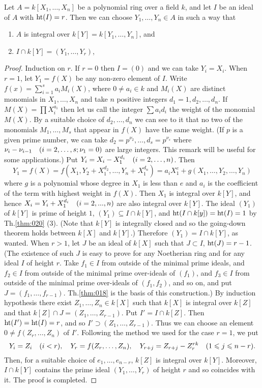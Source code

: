 \documentclass[../main]{subfiles}
\begin{document}
\begin{partheorem}\label{thm:024}
Let $A = k[X_1,\ldots,X_n]$ be a polynomial ring over a field $k$, and let $I$ be an ideal of $A$ with $\operatorname{ht}(I)=r$. Then we can choose $Y_1,\ldots,Y_n\in A$ in such a way that
\begin{enumerate}[label=\arabic*)]
    \item $A$ is integral over $k[Y] = k[Y_1,\ldots,Y_n]$, and
    \item $I\cap k[Y] = (Y_1,\ldots,Y_r)$,
\end{enumerate}
\end{partheorem}
\begin{proof}
Induction on $r$. If $r= 0$ then $I = (0)$ and we can take $Y_i=X_i$. When $r = 1$, let $Y_1=f(X)$ be any non-zero element of $I$. Write $f(x) = \sum_{i=1}^sa_iM_i(X)$, where $0 \neq a_i\in k$ and $M_i(X)$ are distinct monomials in $X_1,\ldots,X_n$ and take $n$ positive integers $d_1=1,d_2,\ldots,d_n$. If $M(X) = \prod X_i^{a_i}$ then let us call the integer $\sum a_id_i$ the weight of the monomial $M(X)$. By a suitable choice of $d_2,\ldots,d_n$ we can see to it that no two of the monomials $M_1,\ldots,M_s$ that appear in $f(X)$ have the same weight. (If $p$ is a given prime number, we can take $d_2=p^{\nu_2},\ldots,d_s = p^{\nu_s}$ where $\nu_i-\nu_{i-1}\for{i = 2,\ldots,s;\nu_1 = 0}$ are large integers. This remark will be useful for some applications.) Put $Y_i =X_i-X_1^{d_i}\for{i=2,\ldots,n}$. Then \[Y_1 = f(X) = f(X_1,Y_2+X_1^{d_2},\ldots,Y_n+X_1^{d_n})=a_iX_1^e+g(X_1,\ldots,Y_2,\ldots,Y_n)\] where $g$ is a polynomial whose degree in $X_1$ is less than $e$ and $a_i$ is the coefficient of the term with highest weight in $f(X)$. Then $X_1$ is integral over $k[Y]$, and hence $X_i=Y_i+X_1^{d_i}\for{i = 2,...,n}$ are also integral over $k[Y]$. The ideal $(Y_1)$ of $k[Y]$ is prime of height $1$, $(Y_1)\subseteq I\cap k[Y]$, and $\operatorname{ht}(I\cap k[y]) = \operatorname{ht}(I) = 1$ by Th.\ref{thm:020} (3). (Note that $k[Y]$ is integrally closed and so the going-down theorem holds between $k[X]$ and $k[Y]$.) Therefore $(Y_1) = I\cap k[Y]$, as wanted. When $r > 1$, let $J$ be an ideal of $k[X]$ such that $J\subset I$, $\operatorname{ht}(J) =r-1$. (The existence of such $J$ is easy to prove for any Noetherian ring and for any ideal $I$ of height $r$. Take $f_1 \in I$ from outside of the minimal prime ideals, and $f_2\in I$ from outside of the minimal prime over-ideals of $(f_1)$, and $f_3\in I$ from outside of the minimal prime over-ideals of $(f_1,f_2)$, and so on, and put $J = (f_1,\ldots,f_{r-1})$. Th.\ref{thm:018} is the basis of this construction.) By induction hypothesis there exist $Z_1,\ldots,Z_n\in k[X]$ such that $k[X]$ is integral over $k[Z]$ and that $k[Z]\cap J=(Z_1,\ldots,Z_{r-1})$. Put $I' = I\cap k[Z]$. Then $\operatorname{ht}(I') = \operatorname{ht}(I) = r$, and so $I'\supset(Z_1,\ldots, Z_{r-1})$. Thus we can choose an element $0\neq f(Z_r,\ldots,Z_n)$ of $I'$. Following the method we used for the case $r = 1$, we put \[Y_i = Z_i\for{i<r},\quad  Y_r=f(Z_r,\ldots,Z_n),\quad Y_{r+j}=Z_{r+j}-Z_r^{rk}\for{1\leqslant j\leqslant n-r}.\] Then, for a suitable choice of $e_1,\ldots,e_{n-r}$, $k[Z]$ is integral over $k[Y]$. Moreover, $I\cap k[Y]$ contains the prime ideal $(Y_1,\ldots,Y_r)$ of height $r$ and so coincides with it. The proof is completed.

\end{proof}
\end{document}
